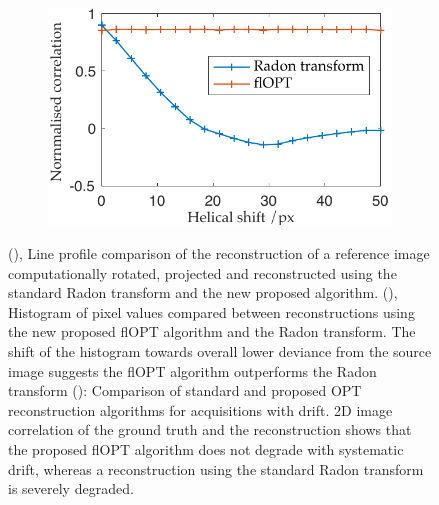 \documentclass{osa-article}
\begin{document}
\begin{figure}
\begin{subfigure}[t]{0.45\linewidth}
    \caption{}\label{fig:flopt_histogram}
  \end{subfigure}\\
  \begin{subfigure}[t]{0.45\linewidth}
    \centering
    \includegraphics[width=\linewidth]{./figures/results/correlation_helicity}
    \caption{}\label{fig:helical_comparison}
  \end{subfigure}
  \caption{
    (), Line profile comparison of the reconstruction of a reference image computationally rotated, projected and reconstructed using the standard Radon transform and the new proposed algorithm.
    (), Histogram of pixel values compared between reconstructions using the new proposed flOPT algorithm and the Radon transform.
    The shift of the histogram towards overall lower deviance from the source image suggests the flOPT algorithm outperforms the Radon transform
    (): Comparison of standard and proposed OPT reconstruction algorithms for acquisitions with drift.
    2D image correlation of the ground truth and the reconstruction shows that the proposed flOPT algorithm does not degrade with systematic drift, whereas a reconstruction using the standard Radon transform is severely degraded.}
\end{figure}
\end{document}
